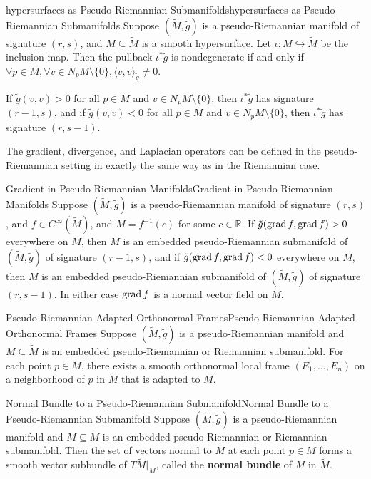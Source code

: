 \documentclass[../main.tex]{subfiles}
\begin{document}
\begin{proposition}{hypersurfaces as Pseudo-Riemannian Submanifolds}{hypersurfaces as Pseudo-Riemannian Submanifolds}
	Suppose $(\tilde{M}, \tilde{g})$ is a pseudo-Riemannian manifold of signature $(r, s)$, and $M \subseteq \tilde{M}$ is a smooth hypersurface. Let $\iota: M \hookrightarrow \tilde{M}$ be the inclusion map. Then the pullback $\iota^* \tilde{g}$ is nondegenerate if and only if $\forall p \in M, \forall v \in N_pM \setminus \{0\}, \langle v, v \rangle_{\tilde{g}} \neq 0$.

	If $\tilde{g}(v, v) > 0$ for all $p \in M$ and $v \in N_pM \setminus \{0\}$, then $\iota^* \tilde{g}$ has signature $(r-1, s)$, and if $\tilde{g}(v, v) < 0$ for all $p \in M$ and $v \in N_pM \setminus \{0\}$, then $\iota^* \tilde{g}$ has signature $(r, s-1)$.
\end{proposition}

The gradient, divergence, and Laplacian operators can be defined in the pseudo-Riemannian setting in exactly the same way as in the Riemannian case.

\begin{proposition}{Gradient in Pseudo-Riemannian Manifolds}{Gradient in Pseudo-Riemannian Manifolds}
	Suppose $(\tilde{M}, \tilde{g})$ is a pseudo-Riemannian manifold of signature $(r, s)$, and $f \in C^\infty(\tilde{M})$, and $M = f^{-1}(c)$ for some $c \in \mathbb{R}$. If $\tilde{g}(\operatorname{grad} f, \operatorname{grad} f) > 0$ everywhere on $M$, then $M$ is an embedded pseudo-Riemannian submanifold of $(\tilde{M}, \tilde{g})$ of signature $(r-1, s)$, and if $\tilde{g}(\operatorname{grad} f, \operatorname{grad} f) < 0$ everywhere on $M$, then $M$ is an embedded pseudo-Riemannian submanifold of $(\tilde{M}, \tilde{g})$ of signature $(r, s-1)$. In either case $\operatorname{grad} f$ is a normal vector field on $M$.
\end{proposition}

\begin{proposition}{Pseudo-Riemannian Adapted Orthonormal Frames}{Pseudo-Riemannian Adapted Orthonormal Frames}
	Suppose $(\tilde{M}, \tilde{g})$ is a pseudo-Riemannian manifold and $M \subseteq \tilde{M}$ is an embedded pseudo-Riemannian or Riemannian submanifold. For each point $p \in M$, there exists a smooth orthonormal local frame $(E_1, \ldots, E_n)$ on a neighborhood of $p$ in $\tilde{M}$ that is adapted to $M$.
\end{proposition}

\begin{proposition}{Normal Bundle to a Pseudo-Riemannian Submanifold}{Normal Bundle to a Pseudo-Riemannian Submanifold}
	Suppose $(\tilde{M}, \tilde{g})$ is a pseudo-Riemannian manifold and $M \subseteq \tilde{M}$ is an embedded pseudo-Riemannian or Riemannian submanifold. Then the set of vectors normal to $M$ at each point $p \in M$ forms a smooth vector subbundle of $T\tilde{M}|_M$, called the \textbf{normal bundle} of $M$ in $\tilde{M}$.
\end{proposition}
\end{document}
